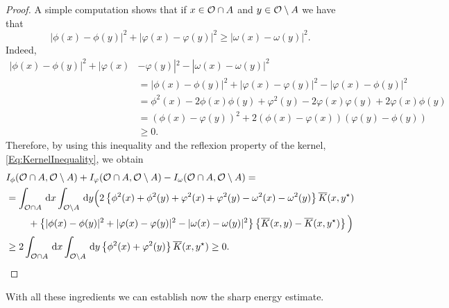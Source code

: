 \begin{proof}
A simple computation shows that if $x\in \mathcal{O} \cap A$ and $y\in \mathcal{O} \setminus A$ we have that
$$ |\phi(x)-\phi(y)|^2+|\varphi(x)-\varphi(y)|^2\geq |\omega(x)-\omega(y)|^2. $$
Indeed,
\begin{align*}
|\phi(x)-\phi(y)|^2+|\varphi(x)&-\varphi(y)|^2 - |\omega(x)-\omega(y)|^2 \\
&= |\phi(x)-\phi(y)|^2+|\varphi(x)-\varphi(y)|^2 - |\varphi(x)-\phi(y)|^2 \\
&= \phi^2(x)-2\phi(x)\phi(y)+\varphi^2(y)-2\varphi(x)\varphi(y)+2\varphi(x)\phi(y) \\
&= \left( \phi(x) - \varphi(y)\right) ^2+2\left( \phi(x)-\varphi(x) \right) \left( \varphi(y)-\phi(y) \right) \\
&\geq 0.
\end{align*}
Therefore, by using this inequality and the reflexion property of the kernel, \eqref{Eq:KernelInequality}, we obtain
\begin{align*}
I_\phi(\ocal\cap A, \ocal \setminus A) &+ I_\varphi(\ocal\cap A, \ocal \setminus A) - I_\omega(\ocal\cap A, \ocal \setminus A) =\\
&\hspace{-26mm}= \int_{\ocal\cap A} \d x \int_{\ocal\setminus A} \d y \Big( 2\left\{\phi^2(x)+\phi^2(y)+\varphi^2(x)+\varphi^2(y)-\omega^2(x)-\omega^2(y) \right\} \overline{K}(x,y^\star) \Big.\\
&\hspace{-18mm}\Big.+  \left\{|\phi(x)-\phi(y)|^2+|\varphi(x)-\varphi(y)|^2-|\omega(x)-\omega(y)|^2 \right\} \left\{\overline{K}(x,y)-\overline{K}(x,y^\star)\right\}\Big)\\
&\hspace{-26mm}\geq 2\int_{\ocal\cap A} \d x \int_{\ocal\setminus A} \d y \left\{
\phi^2(x)+\varphi^2(y)\right\} \overline{K}(x,y^\star) \geq 0.
\end{align*}
\end{proof}



With all these ingredients we can establish now the sharp energy estimate.

